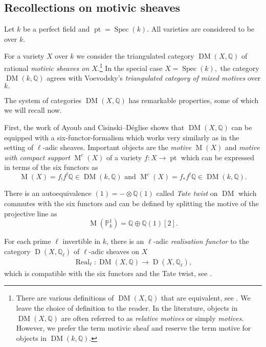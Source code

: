 \documentclass{amsart}
\theoremstyle{plain}
\theoremstyle{TheoremNum}
\theoremstyle{definition}
\theoremstyle{remark}
\numberwithin{equation}{section}
\newcommand{\Q}{\mathbb{Q}}
\newcommand{\Mot}{\operatorname{M}}
\newcommand{\DM}{\operatorname{DM}}
\newcommand{\poi}{\operatorname{pt}}
\newcommand{\Spec}{\operatorname{Spec}}
\newcommand{\Dladic}{\operatorname{D}}
\newcommand{\Real}{\operatorname{Real}}
\begin{document}
\subsection{Recollections on motivic sheaves}
Let $k$ be a perfect field and $\poi=\Spec(k).$ All varieties are considered to be over $k.$

For a variety $X$ over $k$ we consider the triangulated category $\DM(X,\Q)$ of rational \emph{motivic sheaves on $X.$}\footnote{There are various definitions of $\DM(X,\Q)$ that are equivalent, see \cite[Section C.3]{cisinski_triangulated_2019}. We leave the choice of definition to the reader. In the literature, objects in $\DM(X,\Q)$ are often referred to as \emph{relative motives} or simply \emph{motives}. However, we prefer the term motivic sheaf and reserve the term motive for objects in $\DM(k,\Q)$.} 
In the special case $X=\Spec(k),$ the category $\DM(k,\Q)$ agrees with Voevodsky's \emph{triangulated category of mixed motives} over $k.$

The system of categories $\DM(X,\Q)$ has remarkable properties, some of which we will recall now. 

First, the work of Ayoub \cite{ayoub_les_2007,ayoub_les_20072} and Cisinski--Déglise \cite{cisinski_triangulated_2019} shows that $\DM(X,\Q)$ can be equipped with a six-functor-formalism which works very similarly as in the setting of $\ell$-adic sheaves. Important objects are the \emph{motive} $\Mot(X)$ and \emph{motive with compact support} $\Mot^c(X)$ of a variety $f:X\to \poi$ which can be expressed in terms of the six functors as
$$\Mot(X)=f_!f^!\Q\in \DM(k, \Q) \text{ and } \Mot^c(X)=f_*f^!\Q\in \DM(k, \Q).$$

There is an autoequivalence $(1)=-\otimes \Q(1)$ called \emph{Tate twist} on $\DM$ which commutes with the six functors and can be defined by splitting the motive of the projective line as
$$\Mot(\mathbb{P}^1_k)=\Q\oplus \Q(1)[2].$$

For each prime $\ell$ invertible in $k$, there is an $\ell$-adic \emph{realisation functor} to the category $\Dladic(X,\Q_\ell)$ of $\ell$-adic sheaves on $X$
\begin{align}
    \Real_\ell: \DM(X,\Q)\to \Dladic(X,\Q_\ell),\label{eq:realisationfunctor}
\end{align}
which is compatible with the six functors and the Tate twist, see \cite{ayoub_realisation_2014}.
\end{document}
